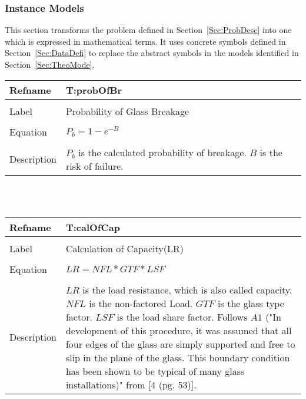 \documentclass[12pt]{article}
\begin{document}
\subsubsection{Instance Models}
\label{Sec:InstMode}
This section transforms the problem defined in Section~\ref{Sec:ProbDesc} into one which is expressed in mathematical terms. It uses concrete symbols defined in Section~\ref{Sec:DataDefi} to replace the abstract symbols in the models identified in Section~\ref{Sec:TheoMode}.
~\newline
\noindent \begin{minipage}{\textwidth}
\begin{tabular}{p{} p{}}
\toprule \textbf{Refname} & \textbf{T:probOfBr}
\label{T:probOfBr}
\\ \midrule \\
Label & Probability of Glass Breakage
\\ \midrule \\
Equation & $P_{b}=1-e^{-B}$
\\ \midrule \\
Description & $P_{b}$ is the calculated probability of breakage. $B$ is the risk of failure.
\\ \bottomrule \end{tabular}
\end{minipage}\\
~\newline
\noindent \begin{minipage}{\textwidth}
\begin{tabular}{p{} p{}}
\toprule \textbf{Refname} & \textbf{T:calOfCap}
\label{T:calOfCap}
\\ \midrule \\
Label & Calculation of Capacity(LR)
\\ \midrule \\
Equation & $LR=NFL*GTF*LSF$
\\ \midrule \\
Description & $LR$ is the load resistance, which is also called capacity. $NFL$ is the non-factored Load. $GTF$ is the glass type factor. $LSF$ is the load share factor. Follows $A1$ ("In development of this procedure, it was assumed that all four edges of the glass are simply supported and free to slip in the plane of the glass. This boundary condition has been shown to be typical of many glass installations)" from [4 (pg. 53)].
\\ \bottomrule \end{tabular}
\end{minipage}\\
\end{document}
